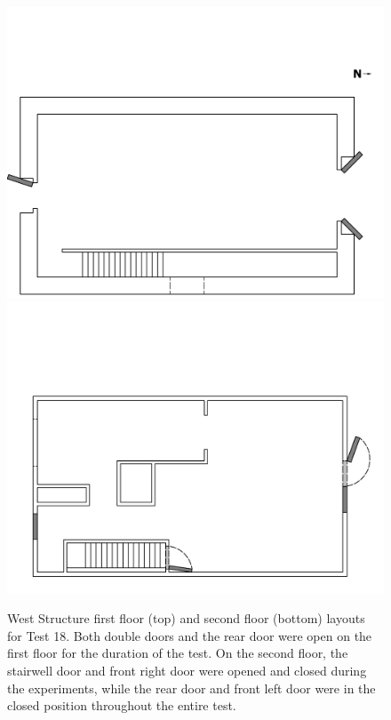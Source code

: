 \documentclass[12pt,oneside]{book}
\begin{document}
\begin{figure}[!ht]
\includegraphics[width=6in]{../../Drawings/PDFs/Without_Intrumentation/West_Structure_Hose_Test_18_1st_Floor}
\\
\includegraphics[width=6in]{../../Drawings/PDFs/Without_Intrumentation/West_Structure_Hose_Test_18_2nd_Floor}
\caption{West Structure first floor (top) and second floor (bottom) layouts for Test 18. Both double doors and the rear door were open on the first floor for the duration of the test. On the second floor, the stairwell door and front right door were opened and closed during the experiments, while the rear door and front left door were in the closed position throughout the entire test.}
\label{fig:test_18_plan}
\end{figure}
\end{document}
